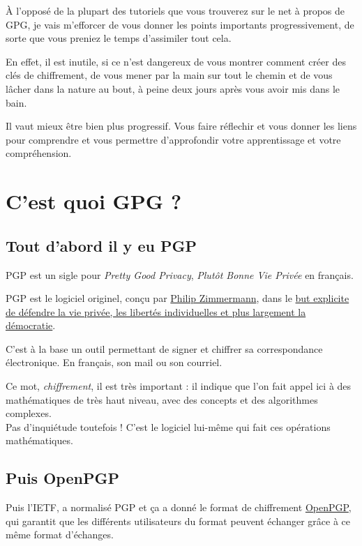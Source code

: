 À l'opposé de la plupart des tutoriels que vous trouverez sur le net à
propos de GPG, je vais m'efforcer de vous donner les points importants
progressivement, de sorte que vous preniez le temps d'assimiler tout
cela.

En effet, il est inutile, si ce n'est dangereux de vous montrer comment
créer des clés de chiffrement, de vous mener par la main sur tout le
chemin et de vous lâcher dans la nature au bout, à peine deux jours
après vous avoir mis dans le bain.

Il vaut mieux être bien plus progressif. Vous faire réflechir et vous
donner les liens pour comprendre et vous permettre d'approfondir votre
apprentissage et votre compréhension.

\section{C'est quoi GPG ?}\label{cest-quoi-gpg}

\subsection{Tout d'abord il y eu PGP}\label{tout-dabord-il-y-eu-pgp}

PGP est un sigle pour \emph{Pretty Good Privacy}, \emph{Plutôt Bonne Vie Privée} en français.

PGP est le logiciel originel, conçu par \href{http://philzimmermann.com/FR/background/index.html}{Philip Zimmermann}, dans le
\href{http://openpgp.vie-privee.org/pourquoi.htm}{but explicite de
défendre la vie privée, les libertés individuelles et plus largement la
démocratie}.

C'est à la base un outil permettant de signer et chiffrer sa correspondance électronique. En français, son mail ou son courriel.

Ce mot, \emph{chiffrement}, il est très important : il indique que l'on
fait appel ici à des mathématiques de très haut niveau, avec des
concepts et des algorithmes complexes.\\Pas d'inquiétude toutefois !
C'est le logiciel lui-même qui fait ces opérations mathématiques.

\subsection{Puis OpenPGP}\label{puis-openpgp}

Puis l'IETF, a normalisé PGP et ça a donné le format de chiffrement
\href{https://fr.wikipedia.org/wiki/OpenPGP}{OpenPGP}, qui garantit que
les différents utilisateurs du format peuvent échanger grâce à ce même
format d'échanges.

